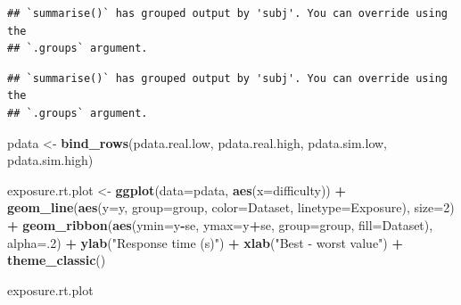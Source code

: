 \documentclass[
]{book}
\newenvironment{Shaded}{\begin{snugshade}}{\end{snugshade}}
\newcommand{\AttributeTok}[1]{\textcolor[rgb]{0.13,0.29,0.53}{#1}}
\newcommand{\DecValTok}[1]{\textcolor[rgb]{0.00,0.00,0.81}{#1}}
\newcommand{\FunctionTok}[1]{\textcolor[rgb]{0.13,0.29,0.53}{\textbf{#1}}}
\newcommand{\NormalTok}[1]{#1}
\newcommand{\OtherTok}[1]{\textcolor[rgb]{0.56,0.35,0.01}{#1}}
\newcommand{\SpecialCharTok}[1]{\textcolor[rgb]{0.81,0.36,0.00}{\textbf{#1}}}
\newcommand{\StringTok}[1]{\textcolor[rgb]{0.31,0.60,0.02}{#1}}
\begin{document}
\begin{verbatim}
## `summarise()` has grouped output by 'subj'. You can override using the
## `.groups` argument.
\end{verbatim}

\begin{Shaded}
\end{Shaded}

\begin{verbatim}
## `summarise()` has grouped output by 'subj'. You can override using the
## `.groups` argument.
\end{verbatim}

\begin{Shaded}
\begin{Highlighting}[]
\NormalTok{pdata }\OtherTok{\textless{}{-}} \FunctionTok{bind\_rows}\NormalTok{(pdata.real.low, pdata.real.high, pdata.sim.low, pdata.sim.high)}

\NormalTok{exposure.rt.plot }\OtherTok{\textless{}{-}} \FunctionTok{ggplot}\NormalTok{(}\AttributeTok{data=}\NormalTok{pdata, }\FunctionTok{aes}\NormalTok{(}\AttributeTok{x=}\NormalTok{difficulty)) }\SpecialCharTok{+}
  \FunctionTok{geom\_line}\NormalTok{(}\FunctionTok{aes}\NormalTok{(}\AttributeTok{y=}\NormalTok{y, }\AttributeTok{group=}\NormalTok{group, }\AttributeTok{color=}\NormalTok{Dataset, }\AttributeTok{linetype=}\NormalTok{Exposure), }\AttributeTok{size=}\DecValTok{2}\NormalTok{) }\SpecialCharTok{+}
  \FunctionTok{geom\_ribbon}\NormalTok{(}\FunctionTok{aes}\NormalTok{(}\AttributeTok{ymin=}\NormalTok{y}\SpecialCharTok{{-}}\NormalTok{se, }\AttributeTok{ymax=}\NormalTok{y}\SpecialCharTok{+}\NormalTok{se, }\AttributeTok{group=}\NormalTok{group, }\AttributeTok{fill=}\NormalTok{Dataset), }\AttributeTok{alpha=}\NormalTok{.}\DecValTok{2}\NormalTok{) }\SpecialCharTok{+}
  \FunctionTok{ylab}\NormalTok{(}\StringTok{"Response time (s)"}\NormalTok{) }\SpecialCharTok{+}
  \FunctionTok{xlab}\NormalTok{(}\StringTok{"Best {-} worst value"}\NormalTok{) }\SpecialCharTok{+}
  \FunctionTok{theme\_classic}\NormalTok{() }

\NormalTok{exposure.rt.plot}
\end{Highlighting}
\end{Shaded}
\end{document}
